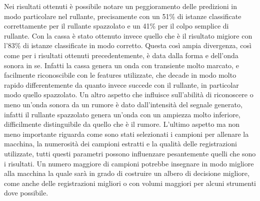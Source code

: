 Nei risultati ottenuti è possibile notare un peggioramento delle predizioni in modo particolare nel rullante, precisamente con un 51\% di istanze classificate correttamente per il rullante spazzolato e un 41\% per il colpo semplice di rullante. Con la cassa è stato ottenuto invece quello che è il risultato migiore con l'83\% di istanze classificate in modo corretto. Questa così ampia divergenza, così come per i risultati ottenuti precedentemente, è data dalla forma e dell'onda sonora in se. Infatti la cassa genera un onda con transiente molto marcato, e facilmente riconoscibile con le features utilizzate, che decade in modo molto rapido differentemente da quanto invece succede con il rullante, in particolar modo quello spazzolato. Un altro aspetto che influisce sull'abilità di riconoscere o meno un'onda sonora da un rumore è dato dall'intensità del segnale generato, infatti il rullante spazzolato genera un'onda con un ampiezza molto inferiore, difficilmente distinguibile da quello che è il rumore. L'ultimo aspetto ma non meno importante riguarda come sono stati selezionati i campioni per allenare la macchina, la numerosità dei campioni estratti e la qualità delle registrazioni utilizzate, tutti questi parametri possono influenzare pesantemente quelli che sono i risultati. Un numero maggiore di campioni potrebbe insegnare in modo migliore alla macchina la quale sarà in grado di costruire un albero di decisione migliore, come anche delle registrazioni migliori o con  volumi maggiori per alcuni strumenti dove possibile.